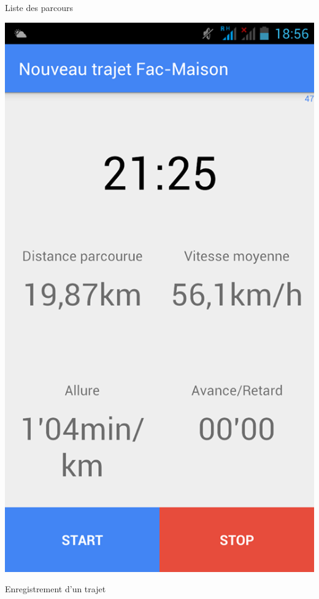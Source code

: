 \begin{appendices}
\begin{multicols}{3}
\begin{img}
  \caption{Liste des parcours}
\end{img}
\begin{img}
  \includegraphics[scale=0.3]{img/direct.jpg}
  \caption{Enregistrement d'un trajet}
\end{img}
\begin{img}

\end{img}
\end{multicols}
\end{appendices}
